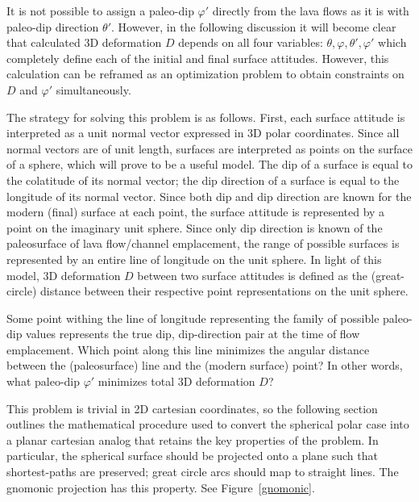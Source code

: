 It is not possible to assign a paleo-dip $\varphi'$ directly from the lava flows as it is with paleo-dip direction $\theta'$. However, in the following discussion it will become clear that calculated 3D deformation $D$ depends on all four variables: $\theta,\varphi,\theta',\varphi'$ which completely define each of the initial and final surface attitudes. However, this calculation can be reframed as an optimization problem to obtain constraints on $D$ and $\varphi'$ simultaneously.

The strategy for solving this problem is as follows. First, each surface attitude is interpreted as a unit normal vector expressed in 3D polar coordinates. Since all normal vectors are of unit length, surfaces are interpreted as points on the surface of a sphere, which will prove to be a useful model. The dip of a surface is equal to the colatitude of its normal vector; the dip direction of a surface is equal to the longitude of its normal vector. Since both dip and dip direction are known for the modern (final) surface at each point, the surface attitude is represented by a point on the imaginary unit sphere. Since only dip direction is known of the paleosurface of lava flow/channel emplacement, the range of possible surfaces is represented by an entire line of longitude on the unit sphere. In light of this model, 3D deformation $D$ between two surface attitudes is defined as the (great-circle) distance between their respective point representations on the unit sphere.

Some point withing the line of longitude representing the family of possible paleo-dip values represents the true dip, dip-direction pair at the time of flow emplacement. Which point along this line minimizes the angular distance between the (paleosurface) line and the (modern surface) point? In other words, what paleo-dip $\varphi'$ minimizes total 3D deformation $D$?

This problem is trivial in 2D cartesian coordinates, so the following section outlines the mathematical procedure used to convert the spherical polar case into a planar cartesian analog that retains the key properties of the problem. In particular, the spherical surface should be projected onto a plane such that shortest-paths are preserved; great circle arcs should map to straight lines. The gnomonic projection has this property. See Figure~\ref{gnomonic}.

